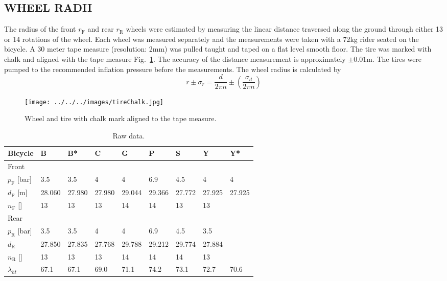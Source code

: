 \documentclass{bmd2010p}
\begin{document}
\subsection{WHEEL RADII}
The radius of the front $r_\mathrm{F}$ and rear $r_\mathrm{R}$ wheels were
estimated by measuring the linear distance traversed along the ground through
either 13 or 14 rotations of the wheel. Each wheel was measured separately and
the measurements were taken with a 72kg rider seated on the bicycle. A 30 meter
tape measure (resolution: 2mm) was pulled taught and taped on a flat level smooth floor. The tire
was marked with chalk and aligned with the tape measure
Fig.~\ref{fig:tireChalk}. The accuracy of the
distance measurement is approximately $\pm0.01$m. The tires were pumped to the
recommended inflation pressure before the measurements. The wheel radius is
calculated by
\begin{equation}
	r\pm\sigma_r=
    \frac{d}{2\pi n}
    \pm\left(\frac{\sigma_d}{2\pi n}\right)
	\label{eq:wheelRadius}
\end{equation}
\begin{figure}[tb]
	\begin{center}
		\texttt{[image: ../../../images/tireChalk.jpg]}
	\end{center}
	\caption{Wheel and tire with chalk mark aligned to the tape measure.}
	\label{fig:tireChalk}
\end{figure}
\begin{table}
    \centering
	\begin{tabular}{lllllllll}
	Bicycle   & B      & B*     & C      & G      & P      & S      & Y & Y*\\
    \hline
	Front\\
    \hline
    $p_\mathrm{F}$ [bar] & 3.5    & 3.5    & 4      & 4      & 6.9    & 4.5 & 4 & 4 \\
    $d_\mathrm{F}$ [m]   & 28.060 & 27.980 & 27.980 & 29.044 & 29.366 & 27.772
    & 27.925 & 27.925\\
    $n_\mathrm{F}$ []    & 13     & 13     & 13     & 14     & 14     & 13     & 13     \\
    \hline
	Rear\\
    \hline
	$p_\mathrm{R}$ [bar] & 3.5    & 3.5    & 4      & 4      & 6.9    & 4.5    & 3.5    \\
	$d_\mathrm{R}$       & 27.850 & 27.835 & 27.768 & 29.788 & 29.212 & 29.774 & 27.884 \\
	$n_\mathrm{R}$ []    & 13     & 13     & 13     & 14     & 14     & 14     & 13     \\
    $\lambda_{ht}$ & 67.1 & 67.1 & 69.0 & 71.1 & 74.2 & 73.1 & 72.7 & 70.6\\
	\end{tabular}
	\caption{Raw data.}
	\label{tab:wheelRadius}
\end{table}
\end{document}
